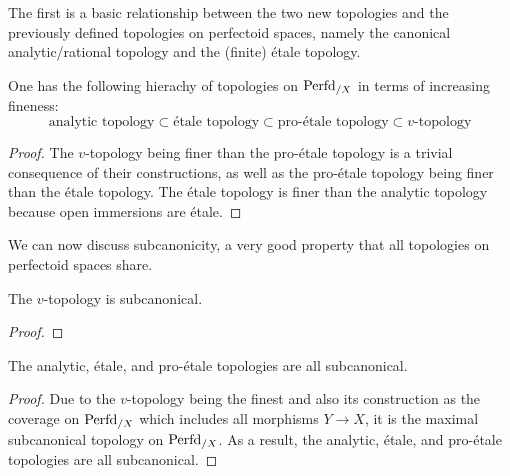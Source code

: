                 The first is a basic relationship between the two new topologies and the previously defined topologies on perfectoid spaces, namely the canonical analytic/rational topology and the (finite) \'etale topology.
                \begin{proposition} \label{prop: perfectoid_topology_hierachy}
                    One has the following hierachy of topologies on $\mathrm{Perfd}_{/X}$ in terms of increasing fineness:
                        $$\text{analytic topology} \subset \text{\'etale topology} \subset \text{pro-\'etale topology} \subset \text{$v$-topology}$$
                \end{proposition}
                    \begin{proof}
                        The $v$-topology being finer than the pro-\'etale topology is a trivial consequence of their constructions, as well as the pro-\'etale topology being finer than the \'etale topology. The \'etale topology is finer than the analytic topology because open immersions are \'etale.
                    \end{proof}
                We can now discuss subcanonicity, a very good property that all topologies on perfectoid spaces share.
                \begin{proposition}[Subcanonicity] \label{prop: perfectoid_topologies_subcanonicity}
                    The $v$-topology is subcanonical.
                \end{proposition}
                    \begin{proof}
                        
                    \end{proof}
                \begin{corollary} \label{coro: perfectoid_topologies_subcanonicity}
                    The analytic, \'etale, and pro-\'etale topologies are all subcanonical.
                \end{corollary}
                    \begin{proof}
                        Due to the $v$-topology being the finest and also its construction as the coverage on $\mathrm{Perfd}_{/X}$ which includes all morphisms $Y \to X$, it is the maximal subcanonical topology on $\mathrm{Perfd}_{/X}$. As a result, the analytic, \'etale, and pro-\'etale topologies are all subcanonical.
                    \end{proof}
                
